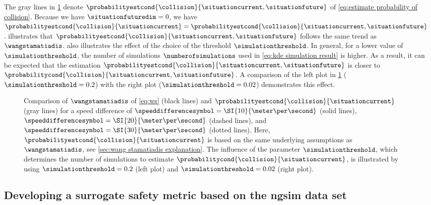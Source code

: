 The gray lines in \cref{fig:ws comparison} denote $\probabilityestcond{\collision}{\situationcurrent,\situationfuture}$ of \cref{eq:estimate probability of collision}.
Because we have $\situationfuturedim=0$, we have $\probabilityestcond{\collision}{\situationcurrent} = \probabilityestcond{\collision}{\situationcurrent,\situationfuture}$.
 illustrates that $\probabilityestcond{\collision}{\situationcurrent,\situationfuture}$ follows the same trend as $\wangstamatiadis$.
 also illustrates the effect of the choice of the threshold $\simulationthreshold$.
In general, for a lower value of $\simulationthreshold$, the number of simulations $\numberofsimulations$ used in \cref{eq:kde simulation result} is higher. 
As a result, it can be expected that the estimation $\probabilityestcond{\collision}{\situationcurrent,\situationfuture}$ is closer to $\probabilitycond{\collision}{\situationcurrent,\situationfuture}$.
A comparison of the left plot in \cref{fig:ws comparison} ($\simulationthreshold=0.2$) with the right plot ($\simulationthreshold=0.02$) demonstrates this effect.

\setlength{\figurewidth}{.47\linewidth}
\setlength{\figureheight}{.7\figurewidth}
\begin{figure}
	\centering
	
	
	\caption{Comparison of $\wangstamatiadis$ of \cref{eq:ws} (black lines) and $\probabilityestcond{\collision}{\situationcurrent}$ (gray lines) for a speed difference of $\speeddifferencesymbol=\SI{10}{\meter\per\second}$ (solid lines), $\speeddifferencesymbol=\SI{20}{\meter\per\second}$ (dashed lines), and $\speeddifferencesymbol=\SI{30}{\meter\per\second}$ (dotted lines).
		Here, $\probabilityestcond{\collision}{\situationcurrent}$ is based on the same underlying assumptions as $\wangstamatiadis$, see \cref{sec:wang stamatiadis explanation}.
		The influence of the parameter $\simulationthreshold$, which determines the number of simulations to estimate $\probabilitycond{\collision}{\situationcurrent}$, is illustrated by using $\simulationthreshold=0.2$ (left plot) and $\simulationthreshold=0.02$ (right plot).}
	\label{fig:ws comparison}
\end{figure}



\subsection{Developing a surrogate safety metric based on the \acs{ngsim} data set}
\label{sec:ngsim metric}

